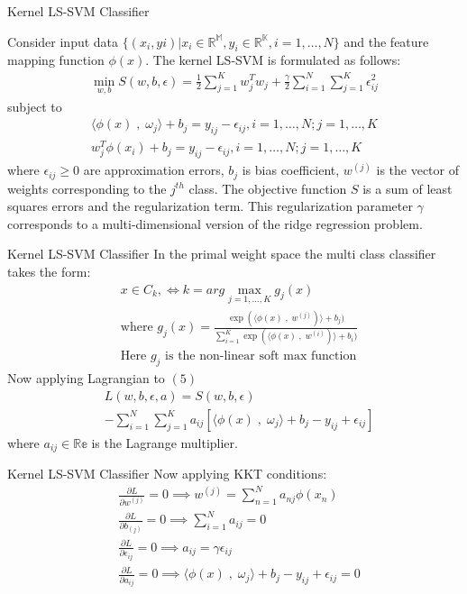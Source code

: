 \documentclass{beamer}
\begin{document}
\begin{frame}{Kernel LS-SVM Classifier}

    Consider input data $\{(x_{i},y{i}) | x_{i}\in\mathbb{R^{M}},y_{i}\in\mathbb{R^{K}}, i = 1,\ldots,N\}$ and the
    feature mapping function $\phi(x)$.
    The kernel LS-SVM is formulated as follows:
    \begin{align}
        \min_{w,b} S(w,b,\epsilon) = \frac{1}{2}\sum_{j=1}^{K}w_{j}^{T}w_{j} + \frac{\gamma}{2}\sum_{i=1}^{N}\sum_{j=1}^{K}\epsilon_{ij}^{2}
    \end{align}
    subject to
    \begin{align}
        \langle \phi(x) \;,\; \omega_{j}  \rangle + b_{j} = y_{ij} - \epsilon_{ij}, i = 1,\ldots,N; j = 1,\ldots,K \\
        w_{j}^{T}\phi(x_{i}) + b_{j} = y_{ij} - \epsilon_{ij} , i = 1,\ldots,N; j = 1,\ldots,K
    \end{align}
    where $\epsilon_{ij} \geq 0$ are approximation errors, $b_{j}$ is bias coefficient, $w^{(j)}$ is the vector of
    weights corresponding to the $j^{th}$ class.
    The objective function $S$ is a sum of least squares errors and the
    regularization term.
    This regularization parameter $\gamma$ corresponds to a multi-dimensional version of the ridge
    regression problem.
\end{frame}
\begin{frame}{Kernel LS-SVM Classifier}
    In the primal weight space the multi class classifier takes the form:
    \begin{align*}
        & x \in C_{k}, \Leftrightarrow k= arg \max_{j=1,\ldots,K} g_{j}(x) \\
        & \text{where } g_{j}(x) = \frac{\exp(\langle \phi(x)\;,\; w^{(j)})\rangle + b_{j})}{\sum_{i=1}^{K} \exp(\langle \phi(x)\;,\; w^{(i)})\rangle + b_{i})} \\
        & \text{Here $g_{j}$ is the non-linear soft max function}
    \end{align*}
    Now applying Lagrangian to $(5)$
    \begin{align*}
        &L(w,b,\epsilon,a) = S(w,b,\epsilon)\\
        &- \sum_{i=1}^{N} \sum_{j=1}^{K} a_{ij}[\langle \phi(x) \;,\; \omega_{j}  \rangle + b_{j} - y_{ij} + \epsilon_{ij}]
    \end{align*}
    where $a_{ij} \in \mathbb{Re}$ is the Lagrange multiplier.
\end{frame}
\begin{frame}{Kernel LS-SVM Classifier}
Now applying KKT conditions:
    \begin{align}
        &\frac{{\partial L}}{{\partial w^{(j)}}} = 0 \implies w^{(j)} = \sum_{n=1}^{N}a_{nj}\phi(x_{n}) \\
        &\frac{{\partial L}}{{\partial b_{(j)}}} = 0 \implies \sum_{i=1}^{N}a_{ij} = 0 \\
        &\frac{{\partial L}}{{\partial \epsilon_{ij}}} = 0 \implies
        a_{ij} = \gamma \epsilon_{ij} \\
        &\frac{{\partial L}}{{\partial a_{ij}}} = 0 \implies
        \langle \phi(x) \;,\; \omega_{j}  \rangle + b_{j} - y_{ij} + \epsilon_{ij} = 0
    \end{align}
    \end{frame}
\end{document}
